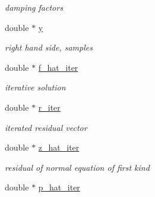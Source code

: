 \begin{DoxyCompactItemize}
\begin{DoxyCompactList}\small\item\em damping factors \end{DoxyCompactList}\item 
\hypertarget{structsolver__plan__double_accc401c5912fe60922d4ce2b30132e18}{double $\ast$ \hyperlink{structsolver__plan__double_accc401c5912fe60922d4ce2b30132e18}{y}}\label{structsolver__plan__double_accc401c5912fe60922d4ce2b30132e18}

\begin{DoxyCompactList}\small\item\em right hand side, samples \end{DoxyCompactList}\item 
\hypertarget{structsolver__plan__double_a25db7056f50bf19ab3e3527050a415d1}{double $\ast$ \hyperlink{structsolver__plan__double_a25db7056f50bf19ab3e3527050a415d1}{f\-\_\-hat\-\_\-iter}}\label{structsolver__plan__double_a25db7056f50bf19ab3e3527050a415d1}

\begin{DoxyCompactList}\small\item\em iterative solution \end{DoxyCompactList}\item 
\hypertarget{structsolver__plan__double_a088f3b3f683ffc2b9c7e42b02fa17183}{double $\ast$ \hyperlink{structsolver__plan__double_a088f3b3f683ffc2b9c7e42b02fa17183}{r\-\_\-iter}}\label{structsolver__plan__double_a088f3b3f683ffc2b9c7e42b02fa17183}

\begin{DoxyCompactList}\small\item\em iterated residual vector \end{DoxyCompactList}\item 
\hypertarget{structsolver__plan__double_aac8b0f141a85d329e39319f6c19f3e48}{double $\ast$ \hyperlink{structsolver__plan__double_aac8b0f141a85d329e39319f6c19f3e48}{z\-\_\-hat\-\_\-iter}}\label{structsolver__plan__double_aac8b0f141a85d329e39319f6c19f3e48}

\begin{DoxyCompactList}\small\item\em residual of normal equation of first kind \end{DoxyCompactList}\item 
\hypertarget{structsolver__plan__double_a21913274af8b42c199546919e2999677}{double $\ast$ \hyperlink{structsolver__plan__double_a21913274af8b42c199546919e2999677}{p\-\_\-hat\-\_\-iter}}\label{structsolver__plan__double_a21913274af8b42c199546919e2999677}


\end{DoxyCompactItemize}
